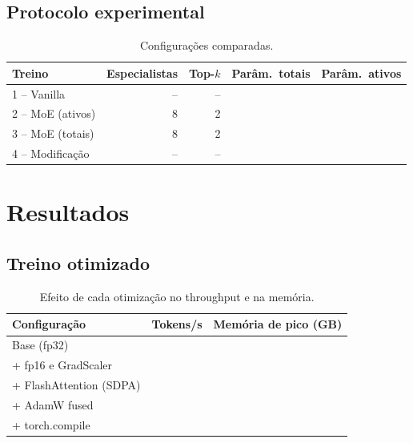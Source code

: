 \documentclass[12pt]{article}
\begin{document}
\subsection{Protocolo experimental}

\begin{table}[ht]
\centering
\caption{Configurações comparadas.}\label{tab:configs}
\begin{tabular}{@{}lrrrr@{}}
\toprule
Treino & Especialistas & Top-$k$ & Parâm.\ totais & Parâm.\ ativos \\
\midrule
1 -- Vanilla        & -- & -- & & \\
2 -- MoE (ativos)   & 8  & 2  & & \\
3 -- MoE (totais)   & 8  & 2  & & \\
4 -- Modificação    & -- & -- & & \\
\bottomrule
\end{tabular}
\end{table}

\section{Resultados}\label{sec:resultados}

\subsection{Treino otimizado}

\begin{table}[ht]
\centering
\caption{Efeito de cada otimização no throughput e na memória.}\label{tab:otimizacoes}
\begin{tabular}{@{}lrr@{}}
\toprule
Configuração & Tokens/s & Memória de pico (GB) \\
\midrule
Base (fp32)            & & \\
+ fp16 e GradScaler    & & \\
+ FlashAttention (SDPA)& & \\
+ AdamW fused          & & \\
+ torch.compile        & & \\
\bottomrule
\end{tabular}
\end{table}
\end{document}

